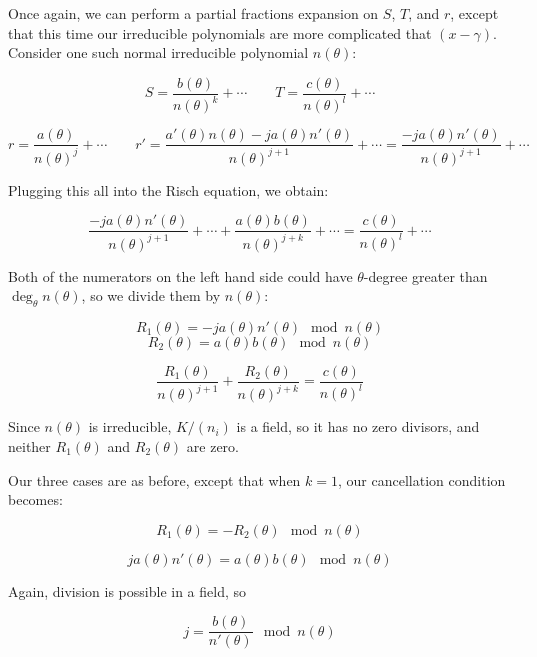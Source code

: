 Once again, we can perform a partial fractions expansion on $S$, $T$,
and $r$, except that this time our irreducible polynomials are more
complicated that $(x-\gamma)$.  Consider one such normal irreducible
polynomial $n(\theta)$:

$$S = \frac{b(\theta)}{n(\theta)^k} + \cdots
\qquad T = \frac{c(\theta)}{n(\theta)^l} + \cdots$$

$$r = \frac{a(\theta)}{n(\theta)^j} + \cdots  \qquad
r' = \frac{a'(\theta)n(\theta)-ja(\theta)n'(\theta)}{n(\theta)^{j+1}} + \cdots = \frac{-ja(\theta)n'(\theta)}{n(\theta)^{j+1}} + \cdots$$

Plugging this all into the Risch equation, we obtain:

$$\frac{-ja(\theta)n'(\theta)}{n(\theta)^{j+1}} + \cdots + \frac{a(\theta) b(\theta)}{n(\theta)^{j+k}} + \cdots = \frac{c(\theta)}{n(\theta)^l} + \cdots$$

Both of the numerators on the left hand side could have $\theta$-degree greater than $\deg_\theta n(\theta)$,
so we divide them by $n(\theta)$:



$$R_1(\theta) = -ja(\theta)n'(\theta) \mod n(\theta)$$
$$R_2(\theta) = a(\theta)b(\theta) \mod n(\theta)$$



$$\frac{R_1(\theta)}{n(\theta)^{j+1}} + \frac{R_2(\theta)}{n(\theta)^{j+k}} = \frac{c(\theta)}{n(\theta)^l}$$


Since $n(\theta)$ is irreducible, $K/(n_i)$ is a field, so it has no zero divisors, and
neither $R_1(\theta)$ and $R_2(\theta)$ are zero.

Our three cases are as before, except that when $k=1$, our cancellation condition becomes:

$$R_1(\theta) = -R_2(\theta) \mod n(\theta)$$

$$ja(\theta)n'(\theta) = a(\theta)b(\theta) \mod n(\theta)$$

Again, division is possible in a field, so

$$j = \frac{b(\theta)}{n'(\theta)} \mod n(\theta)$$

